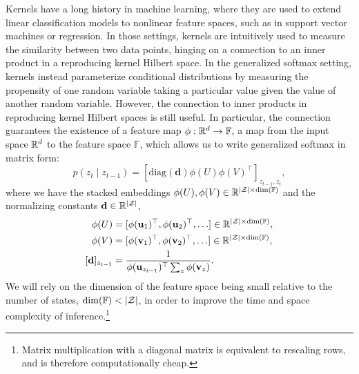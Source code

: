 \documentclass{article}
\begin{document}
Kernels have a long history in machine learning,
where they are used to extend linear classification models to nonlinear feature spaces,
such as in support vector machines or regression.
In those settings, kernels are intuitively used to measure the similarity between two data points,
hinging on a connection to an inner product in a reproducing kernel Hilbert space.
In the generalized softmax setting, kernels instead parameterize conditional distributions by
measuring the propensity of one random variable taking a particular value given
the value of another random variable.
However, the connection to inner products in reproducing kernel Hilbert spaces 
is still useful.
In particular, the connection guarantees the existence of a feature map $\phi:\mathbb{R}^d\to\mathbb{F}$,
a map from the input space $\mathbb{R}^d$ to the feature space $\mathbb{F}$,
which allows us to write generalized softmax in matrix form:
\begin{equation}
\label{eqn:gentrans}
p(z_t \mid z_{t-1}) = [\textrm{diag}(\mathbf{d})\phi(U)\phi(V)^\top]_{z_{t-1},z_t},
\end{equation}
where we have the stacked embeddings $\phi(U),\phi(V)\in\mathbb{R}^{|\mathcal{Z}|\times\dim(\mathbb{F})}$
and the normalizing constants $\mathbf{d}\in\mathbb{R}^{|\mathcal{Z}|}$,
\begin{align*}
\phi(U) &= [\phi(\mathbf{u}_1)^\top, \phi(\mathbf{u}_2)^\top, \ldots] \in\mathbb{R}^{|\mathcal{Z}|\times \dim(\mathbb{F})},\\
\phi(V) &= [\phi(\mathbf{v}_1)^\top, \phi(\mathbf{v}_2)^\top, \ldots]\in\mathbb{R}^{|\mathcal{Z}|\times \dim(\mathbb{F})},\\
[\mathbf{d}]_{z_{t-1}} &= \frac{1}{\phi(\mathbf{u}_{z_{t-1}})^\top \sum_z\phi(\mathbf{v}_z)}.
\end{align*}
We will rely on the dimension of the feature space being small 
relative to the number of states, $\dim(\mathbb{F}) < |\mathcal{Z}|$,
in order to improve the time and space complexity of inference.\footnote{
Matrix multiplication with a diagonal matrix is equivalent to rescaling rows,
and is therefore computationally cheap.
}
\end{document}
